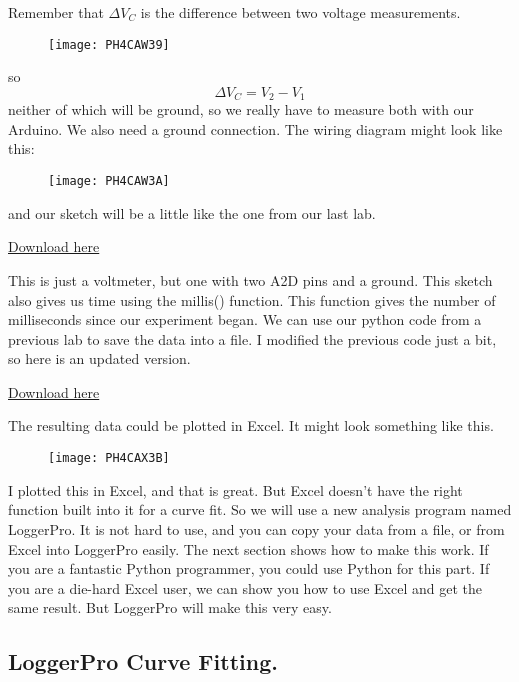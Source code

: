 Remember that $\Delta V_{C}$ is the difference between two voltage
measurements. \begin{figure}[h!]
\texttt{[image: PH4CAW39]}
\end{figure}so 
\begin{equation*}
\Delta V_{C}=V_{2}-V_{1}
\end{equation*}%
neither of which will be ground, so we really have to measure both with our
Arduino. We also need a ground connection. The wiring diagram might look
like this:\begin{figure}[h!]
\texttt{[image: PH4CAW3A]}
\end{figure}and our sketch will be a little
like the one from our last lab.


\href{https://dtoliphant.github.io/PH250Manual/Code/RC_Volts_vsTime.ino}{Download here}





This is just a voltmeter, but one with two A2D pins and a ground. This
sketch also gives us time using the millis() function. This function gives
the number of milliseconds since our experiment began. We can use our python
code from a previous lab to save the data into a file. I modified the
previous code just a bit, so here is an updated version.


\href{https://dtoliphant.github.io/PH250Manual/Code/RC_ReadSaveFile.py}{Download here}




The resulting data could be plotted in Excel. It might look something like
this.\begin{figure}[h!]
\texttt{[image: PH4CAX3B]}
\end{figure}I plotted this in Excel, and that
is great. But Excel doesn't have the right function built into it for a
curve fit. So we will use a new analysis program named LoggerPro. It is not
hard to use, and you can copy your data from a file, or from Excel into
LoggerPro easily. The next section shows how to make this work. If you are a
fantastic Python programmer, you could use Python for this part. If you are
a die-hard Excel user, we can show you how to use Excel and get the same
result. But LoggerPro will make this very easy.

\subsection{LoggerPro Curve Fitting.}

